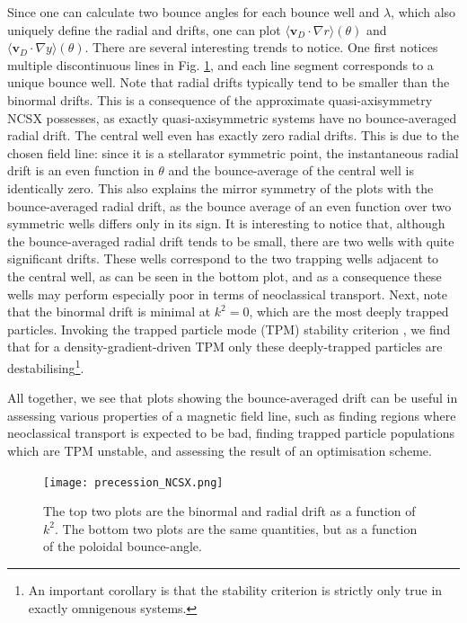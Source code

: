 Since one can calculate two bounce angles for each bounce well and $\lambda$, which also uniquely define the radial and drifts, one can plot $\langle \mathbf{v}_D \cdot \nabla r \rangle (\theta)$ and $\langle \mathbf{v}_D \cdot \nabla y \rangle (\theta)$.
There are several interesting trends to notice. One first notices multiple discontinuous lines in Fig. \ref{fig:ncsx-precession}, and each line segment corresponds to a unique bounce well.  Note that radial drifts typically tend to be smaller than the binormal drifts. This is a consequence of the approximate quasi-axisymmetry NCSX possesses, as exactly quasi-axisymmetric systems have no bounce-averaged radial drift. The central well even has exactly zero radial drifts. This is due to the chosen field line: since it is a stellarator symmetric point, the instantaneous radial drift is an even function in $\theta$ and the bounce-average of the central well is identically zero. This also explains the mirror symmetry of the plots with the bounce-averaged radial drift, as the bounce average of an even function over two symmetric wells differs only in its sign. It is interesting to notice that, although the bounce-averaged radial drift tends to be small, there  are two wells with quite significant drifts. These wells correspond to the two trapping wells adjacent to the central well, as can be seen in the bottom plot, and as a consequence these wells may perform especially poor in terms of neoclassical transport. Next, note that the binormal drift is minimal at $k^2=0$, which are the most deeply trapped particles. Invoking the trapped particle mode (TPM) stability criterion \cite{proll2012resilience}, we find that for a density-gradient-driven TPM only these deeply-trapped particles are destabilising\footnote{An important corollary is that the stability criterion is strictly only true in exactly omnigenous systems.}. \par  
All together, we see that plots showing the bounce-averaged drift can be useful in assessing various properties of a magnetic field line, such as finding regions where neoclassical transport is expected to be bad, finding trapped particle populations which are TPM unstable, and assessing the result of an optimisation scheme.
\begin{figure}
\texttt{[image: precession\_NCSX.png]}
\caption{\label{fig:ncsx-precession} The top two plots are the binormal and radial drift as a function of $k^2$. The bottom two plots are the same quantities, but as a function of the poloidal bounce-angle.} 
\end{figure}
